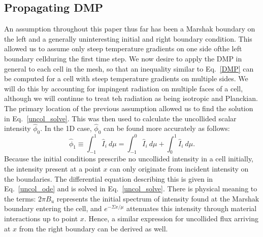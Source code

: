 \subsection{Propagating DMP}\label{propagate}
An assumption throughout this paper thus far has been a Marshak boundary on the
left and a generally uninteresting initial and right boundary condition. 
This allowed us to assume only steep temperature gradients on one side ofthe
left boundary cellduring the first time step. We now desire to apply the DMP in
general to each cell in the mesh, so
that an inequality similar to Eq.\ \eqref{DMP} can be computed for a cell with
steep temperature gradients on
multiple sides.  We will do this by accounting for impingent radiation on
multiple faces of a cell, although we will continue to treat teh radiation as
being isotropic and Planckian.  The primary location of the previous assumption
allowed us to
find the solution in Eq.\ \eqref{uncol_solve}.  This was then used to calculate
the uncollided scalar intensity $\hat\phi_0$.  In the 1D case, $\hat\phi_0$ can
be found more accurately as follows:
\begin{equation}
\hat\phi_1\equiv\int_{-1}^1 \hat I_i\ d\mu = \int_{-1}^0 \hat I_i\ d\mu + 
  \int_0^1 \hat I_i\ d\mu. \label{uncol_gen}
\end{equation}
Because the initial conditions prescribe no uncollided intensity in a cell
initially, the intensity present at a point $x$ can only originate from incident
intensity on the boundaries.  The differential equation describing this is
given in Eq.\ \eqref{uncol_ode} and is solved in Eq.\ \eqref{uncol_solve}. 
There is physical meaning to the terms: $2\pi B_u$ represents the initial
spectrum of intensity found at the Marshak boundary entering the cell, and
$e^{-\Sigma x/\mu}$ attenuates this intensity through material interactions up
to point $x$.  Hence, a similar expression for uncollided flux arriving at $x$
from the right boundary can be derived as well.


